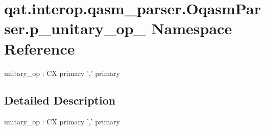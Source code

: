 \hypertarget{namespaceqat_1_1interop_1_1qasm__parser_1_1OqasmParser_1_1p__unitary__op__1}{\section{qat.\-interop.\-qasm\-\_\-parser.\-Oqasm\-Parser.\-p\-\_\-unitary\-\_\-op\-\_ Namespace Reference}
\label{namespaceqat_1_1interop_1_1qasm__parser_1_1OqasmParser_1_1p__unitary__op__1}
}


unitary\-\_\-op \-: C\-X primary ',' primary  




\subsection{Detailed Description}
unitary\-\_\-op \-: C\-X primary ',' primary 